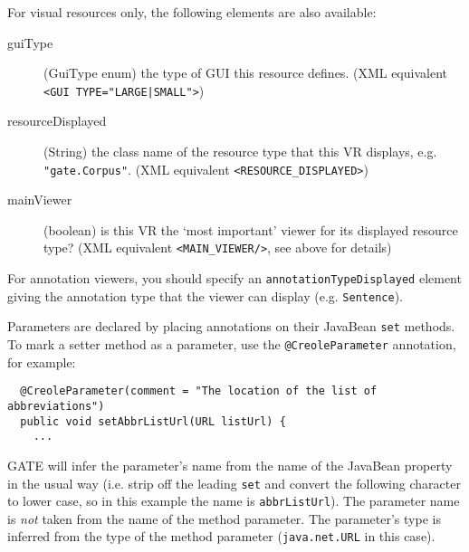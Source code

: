 For visual resources only, the following elements are also available:
\begin{description}
\item[guiType] (GuiType enum) the type of GUI this resource defines.
  (XML equivalent \verb~<GUI TYPE="LARGE|SMALL">~)
\item[resourceDisplayed] (String) the class name of the resource type that this
  VR displays, e.g. \verb|"gate.Corpus"|. (XML equivalent
  \verb|<RESOURCE_DISPLAYED>|)
\item[mainViewer] (boolean) is this VR the `most important' viewer for its
  displayed resource type? (XML equivalent \verb|<MAIN_VIEWER/>|, see above for
  details)
\end{description}

For annotation viewers, you should specify an
\verb|annotationTypeDisplayed| element giving the annotation type that the
viewer can display (e.g. {\tt Sentence}).


Parameters are declared by placing annotations on their JavaBean {\tt set}
methods.  To mark a setter method as a parameter, use the
\verb|@CreoleParameter| annotation, for example:

\begin{small}\begin{verbatim}
  @CreoleParameter(comment = "The location of the list of abbreviations")
  public void setAbbrListUrl(URL listUrl) {
    ...
\end{verbatim}\end{small}

GATE will infer the parameter's name from the name of the JavaBean property in
the usual way (i.e. strip off the leading {\tt set} and convert the following
character to lower case, so in this example the name is {\tt abbrListUrl}).
The parameter name is \emph{not} taken from the name of the method parameter.
The parameter's type is inferred from the type of the method parameter
({\tt java.net.URL} in this case).

